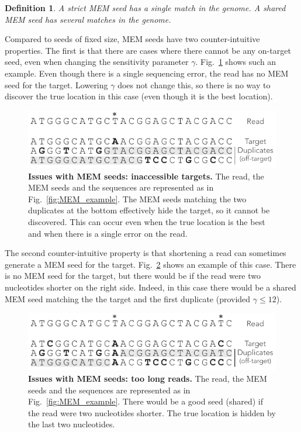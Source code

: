 \documentclass{article}
\newtheorem{definition}{Definition}
\begin{document}
\begin{definition}
A \emph{strict} MEM seed has a single match in the genome.
A \emph{shared} MEM seed has several matches in the genome.
\end{definition}

Compared to seeds of fixed size, MEM seeds have two counter-intuitive
properties. The first is that there are cases where there cannot be any
on-target seed, even when changing the sensitivity parameter $\gamma$.
Fig.~\ref{fig:full_masking_example} shows such an example. Even though
there is a single sequencing error, the read has no MEM seed for the
target. Lowering $\gamma$ does not change this, so there is no way to
discover the true location in this case (even though it is the best
location).

\begin{figure}[h]
\centering
\includegraphics[scale=1]{full_masking_example.pdf}
\caption{\textbf{Issues with MEM seeds: inaccessible targets.}
The read, the MEM seeds and the sequences are represented as in
Fig.~\ref{fig:MEM_example}. The MEM seeds matching the two duplicates
at the bottom effectively hide the target, so it cannot be discovered.
This can occur even when the true location is the best and when there is a
single error on the read.}
\label{fig:full_masking_example}
\end{figure}

The second counter-intuitive property is that shortening a read can
sometimes generate a MEM seed for the target. Fig.~\ref{fig:short_vs_long}
shows an example of this case. There is no MEM seed for the target, but
there would be if the read were two nucleotides shorter on the right
side. Indeed, in this case there would be a shared MEM seed matching the
the target and the first duplicate (provided $\gamma \leq 12$).


\begin{figure}[h]
\centering
\includegraphics[scale=1]{short_vs_long_example.pdf}
\caption{\textbf{Issues with MEM seeds: too long reads.}
The read, the MEM seeds and the sequences are represented as in
Fig.~\ref{fig:MEM_example}. There would be a good seed (shared) if the
read were two nucleotides shorter. The true location is hidden by
the last two nucleotides.}
\label{fig:short_vs_long}
\end{figure}
\end{document}
